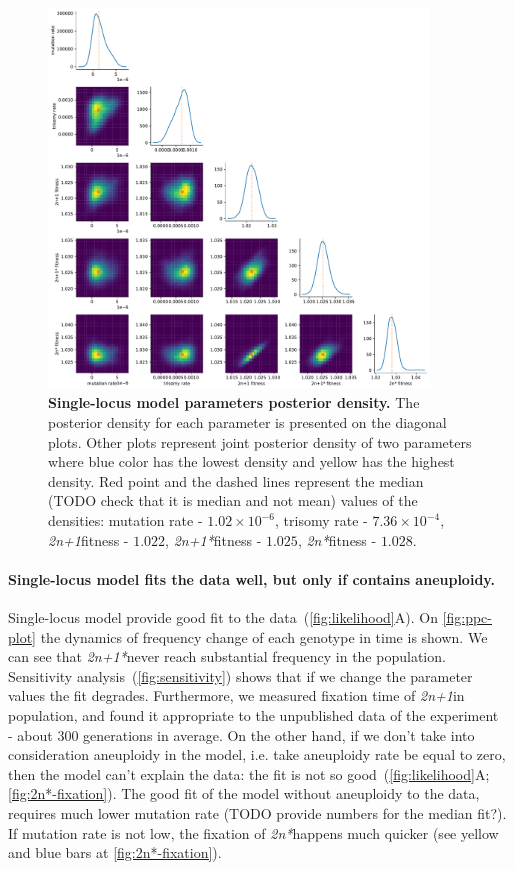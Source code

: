 \documentclass[12pt]{extarticle}
\newcommand{\anwt}{\emph{2n+1}}
\newcommand{\eumt}{\emph{2n*}}
\newcommand{\anmt}{\emph{2n+1*}}
\begin{document}
\begin{figure}[h!]
  \centering
\includegraphics[width=0.9\textwidth]{../figures/posterior.pdf}
  \caption{
  \textbf{Single-locus model parameters posterior density.}
The posterior density for each parameter is presented on the diagonal plots. Other plots represent joint posterior density of two parameters where blue color has the lowest density and yellow has the highest density. Red point and the dashed lines represent the median (TODO check that it is median and not mean) values of the densities: 
mutation rate - $1.02\times10^{-6}$,
trisomy rate - $7.36\times10^{-4}$,
\anwt fitness - $1.022$,
\anmt fitness - $1.025$,
\eumt fitness - $1.028$.
  } 
  \label{fig:posterior}
\end{figure}

\paragraph{Single-locus model fits the data well, but only if contains aneuploidy.} Single-locus model provide good fit to the data~(\autoref{fig:likelihood}A).
On \autoref{fig:ppc-plot} the dynamics of frequency change of each genotype in time is shown. We can see that \anmt never reach substantial frequency in the population.  
Sensitivity analysis~(\autoref{fig:sensitivity}) shows that if we change the parameter values the fit degrades. Furthermore, we measured fixation time of \anwt in population, and found it appropriate to the unpublished data of the experiment ~\citep{Yona2012} - about 300 generations in average.
On the other hand, if we don't take into consideration aneuploidy in the model, i.e. take aneuploidy rate be equal to zero, then the model can't explain the data: the fit is not so good~(\autoref{fig:likelihood}A; \autoref{fig:2n*-fixation}). The good fit of the model without aneuploidy to the data, requires much lower mutation rate (TODO provide numbers for the median fit?). If mutation rate is not low, the fixation of \eumt happens much quicker (see yellow and blue bars at  \autoref{fig:2n*-fixation}).
\end{document}
